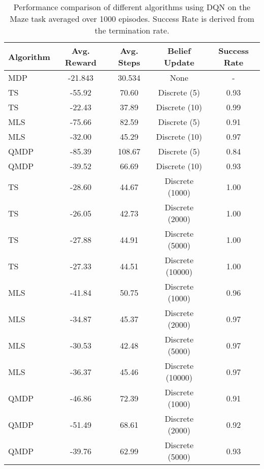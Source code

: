 \begin{table}[H]
    \centering
    \begin{tabular}{lcccc}
    \toprule
    \textbf{Algorithm} & \textbf{Avg. Reward} & \textbf{Avg. Steps} & \textbf{Belief Update} & \textbf{Success Rate}\\
    \midrule
    MDP & -21.843 & 30.534 & None & - \\
    \midrule
        TS & -55.92 & 70.60 & Discrete (5) & 0.93 \\
    TS & -22.43 & 37.89 & Discrete (10) & 0.99 \\
    MLS & -75.66 & 82.59 & Discrete (5) & 0.91 \\
    MLS & -32.00 & 45.29 & Discrete (10) & 0.97 \\
    QMDP & -85.39 & 108.67 & Discrete (5) & 0.84 \\
    QMDP & -39.52 & 66.69 & Discrete (10) & 0.93 \\
    TS & -28.60 & 44.67 & Discrete (1000) & 1.00 \\
    TS & -26.05 & 42.73 & Discrete (2000) & 1.00 \\
    TS & -27.88 & 44.91 & Discrete (5000) & 1.00 \\
    TS & -27.33 & 44.51 & Discrete (10000) & 1.00 \\
    MLS & -41.84 & 50.75 & Discrete (1000) & 0.96 \\
    MLS & -34.87 & 45.37 & Discrete (2000) & 0.97 \\
    MLS & -30.53 & 42.48 & Discrete (5000) & 0.97 \\
    MLS & -36.37 & 45.46 & Discrete (10000) & 0.97 \\
    QMDP & -46.86 & 72.39 & Discrete (1000) & 0.91 \\
    QMDP & -51.49 & 68.61 & Discrete (2000) & 0.92 \\
    QMDP & -39.76 & 62.99 & Discrete (5000) & 0.93 \\
    \midrule
    \bottomrule
    \end{tabular}
    \caption{Performance comparison of different algorithms using DQN on the Maze task averaged over 1000 episodes. Success Rate is derived from the termination rate.}
    \label{tab:maze_results_dqn}
\end{table}
